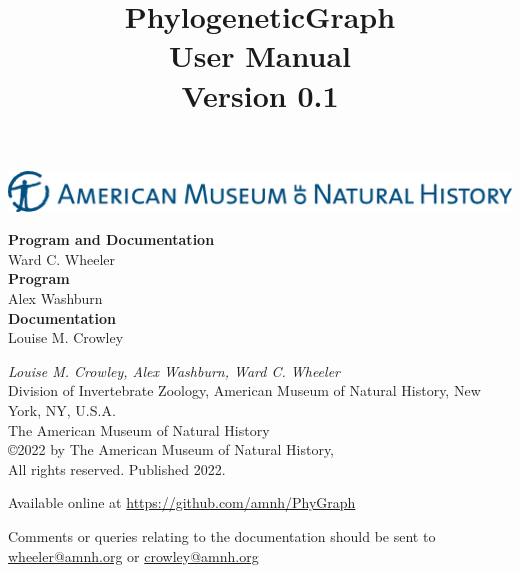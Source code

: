 \documentclass[11pt]{book}
\begin{document}
	
	\title{PhylogeneticGraph\\User Manual\\Version 0.1}
	
	\maketitle
	
	\newpage

	 \begin{center}
		\includegraphics[width=\textwidth]{AMNHLogo.jpg}
	\end{center}

	\vspace*{5.50cm}	
	\begin{flushleft}
		\textbf {Program and Documentation} \\ Ward C. Wheeler \\
		\vspace*{0.50cm}
		\textbf {Program} \\ Alex Washburn \\
		\vspace*{0.50cm}
		\textbf{Documentation} \\ Louise M. Crowley
	\end{flushleft}
	

	\vspace*{5.50cm}
	
	\begin{flushleft}
		\small
		{\it Louise M. Crowley, Alex Washburn, Ward C. Wheeler} \\
		
		Division of Invertebrate Zoology, American Museum of Natural History, New York, NY, U.S.A.\\
		\smallskip
		The American Museum of Natural History\\
		\copyright 2022 by The American Museum of Natural History, \\
		All rights reserved. Published 2022.
		
		\vspace*{0.25cm}
		
		Available online at \url{https://github.com/amnh/PhyGraph}
		
		Comments or queries relating to the documentation should be sent to \href{mailto:wheeler@amnh.org}
		{wheeler@amnh.org} or \href{mailto:crowley@amnh.org}{crowley@amnh.org}
	\end{flushleft}
	
\end{document}
